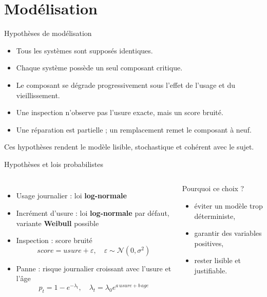 \documentclass[aspectratio=169]{beamer}
\begin{document}
\section{Modélisation}

\begin{frame}{Hypothèses de modélisation}
\begin{itemize}
  \item Tous les systèmes sont supposés identiques.
  \item Chaque système possède un seul composant critique.
  \item Le composant se dégrade progressivement sous l'effet de l'usage et du vieillissement.
  \item Une inspection n'observe pas l'usure exacte, mais un score bruité.
  \item Une réparation est partielle ; un remplacement remet le composant à neuf.
\end{itemize}

\vspace{0.2cm}
Ces hypothèses rendent le modèle lisible, stochastique et cohérent avec le sujet.
\end{frame}

\begin{frame}{Hypothèses et lois probabilistes}
\begin{columns}[T]
\begin{itemize}
  \item Usage journalier : loi \textbf{log-normale}
  \item Incrément d'usure : loi \textbf{log-normale} par défaut, variante \textbf{Weibull} possible
  \item Inspection : score bruité
  $$score = usure + \varepsilon, \quad \varepsilon \sim \mathcal{N}(0,\sigma^2)$$
  \item Panne : risque journalier croissant avec l'usure et l'âge
  $$p_t = 1 - e^{-\lambda_t}, \quad \lambda_t = \lambda_0 e^{a\,usure + b\,age}$$
\end{itemize}

\begin{block}{Pourquoi ce choix ?}
\begin{itemize}
  \item éviter un modèle trop déterministe,
  \item garantir des variables positives,
  \item rester lisible et justifiable.
\end{itemize}
\end{block}
\end{columns}
\end{frame}
\end{document}
